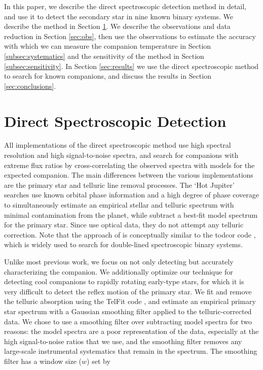 \documentclass{emulateapj}
\begin{document}
In this paper, we describe the direct spectroscopic detection method in detail, and use it to detect the secondary star in nine known binary systems. We describe the method in Section \ref{sec:method}. We describe the observations and data reduction in Section \ref{sec:obs}, then use the observations to estimate the accuracy with which we can measure the companion temperature in Section \ref{subsec:systematics} and the sensitivity of the method in Section \ref{subsec:sensitivity}. In Section \ref{sec:results} we use the direct spectroscopic method to search for known companions, and discuss the results in Section \ref{sec:conclusions}.


\section{Direct Spectroscopic Detection}
\label{sec:method}

All implementations of the direct spectroscopic method use high spectral resolution and high signal-to-noise spectra, and search for companions with extreme flux ratios by cross-correlating the observed spectra with models for the expected companion. The main differences between the various implementations are the primary star and telluric line removal processes. The `Hot Jupiter' searches \citep[e.g.][]{Snellen2010} use known orbital phase information and a high degree of phase coverage to simultaneously estimate an empirical stellar and telluric spectrum with minimal contamination from the planet, while \cite{Kolbl2015} subtract a best-fit model spectrum for the primary star. Since \cite{Kolbl2015} use optical data, they do not attempt any telluric correction. Note that the approach of \cite{Kolbl2015} is conceptually similar to the todcor code \citep{Mazeh1994}, which is widely used to search for double-lined spectroscopic binary systems.

Unlike most previous work, we focus on not only detecting but accurately characterizing the companion. We additionally optimize our technique for detecting cool companions to rapidly rotating early-type stars, for which it is very difficult to detect the reflex motion of the primary star. We fit and remove the telluric absorption using the TelFit code \citep{Gullikson2014}, and estimate an empirical primary star spectrum with a Gaussian smoothing filter applied to the telluric-corrected data. We chose to use a smoothing filter over subtracting model spectra for two reasons: the model spectra are a poor representation of the data, especially at the high signal-to-noise ratios that we use, and the smoothing filter removes any large-scale instrumental systematics that remain in the spectrum. The smoothing filter has a  window size ($w$) set by
\end{document}
